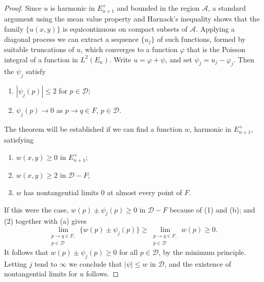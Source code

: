 \begin{proof}
Since $u$ is harmonic in $E_{n+1}^+$ and bounded in the region $\mathcal{A}$, a standard argument using the mean value property and Harnack's inequality shows that the family $\{u(x, y)\}$ is equicontinuous on compact subsets of $\mathcal{A}$. Applying a diagonal process we can extract a sequence $\{u_j\}$ of such functions, formed by suitable truncations of $u$, which converges to a function $\varphi$ that is the Poisson integral of a function in $L^2(E_n)$. Write $u = \varphi + \psi$, and set $\psi_j = u_j - \varphi_j$. Then the $\psi_j$ satisfy
\begin{enumerate}
\item[(1)] $|\psi_j(p)| \leq 2$ for $p \in \mathcal{D}$;
\item[(2)] $\psi_j(p) \to 0$ as $p \to q \in F$, $p \in \mathcal{D}$.
\end{enumerate}
The theorem will be established if we can find a function $w$, harmonic in $E_{n+1}^+$, satisfying
\begin{enumerate}
\item[(a)] $w(x, y) \geq 0$ in $E_{n+1}^+$;
\item[(b)] $w(x, y) \geq 2$ in $\mathcal{D} - F$;
\item[(c)] $w$ has nontangential limits $0$ at almost every point of $F$.
\end{enumerate}
If this were the case, $w(p) \pm \psi_j(p) \geq 0$ in $\mathcal{D} - F$ because of (1) and (b); and (2) together with (a) gives
\[
\lim_{\substack{p \to q \in F, \\ p \in \mathcal{D}}} \{w(p) \pm \psi_j(p)\} \geq \lim_{\substack{p \to q \in F, \\ p \in \mathcal{D}}} w(p) \geq 0.
\]
It follows that $w(p) \pm \psi_j(p) \geq 0$ for all $p \in \mathcal{D}$, by the minimum principle. Letting $j$ tend to $\infty$ we conclude that $|\psi| \leq w$ in $\mathcal{D}$, and the existence of nontangential limits for $u$ follows.


\end{proof}
